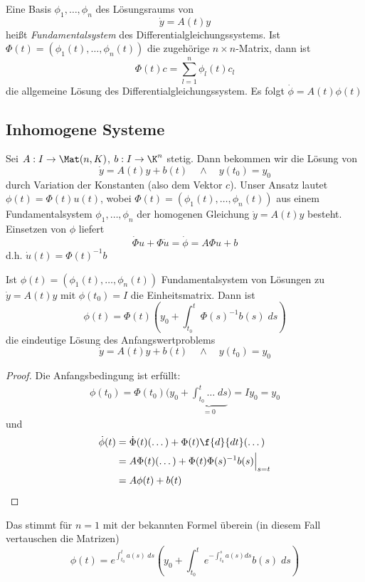 \documentclass{mycourse}
\begin{document}
Eine Basis $\phi_1,\dotsc, \phi_n$ des Lösungsraums von
\[
	\dot y = A(t) y
\]
heißt \emph{Fundamentalsystem} des Differentialgleichungssystems.
Ist $\Phi(t) = (\phi_1(t), \dotsc, \phi_n(t))$ die zugehörige $n\times n$-Matrix, dann ist
\[
	\Phi(t) c = \sum_{l=1}^n \phi_l(t) c_l
\]
die allgemeine Lösung des Differentialgleichungssystem.
Es folgt $\dot \phi = A(t) \phi(t)$


\subsection{Inhomogene Systeme}

Sei $A : I \to \Mat(n,K)$, $b:I\to \K^n$ stetig.
Dann bekommen wir die Lösung von
\[
	\dot y = A(t)y + b(t) \quad \land \quad y(t_0) = y_0
\]
durch Variation der Konstanten (also dem Vektor $c$).
Unser Ansatz lautet	$\phi(t) = \Phi(t) u(t)$, wobei
$\Phi(t) = (\phi_1(t),\dotsc, \phi_n(t))$ aus einem Fundamentalsystem $\phi_1,\dotsc, \phi_n$ der homogenen Gleichung $\dot y = A(t)y$ besteht.
Einsetzen von $\phi$ liefert
\[
	\dot \Phi u + \Phi \dot u = \dot \phi = A\Phi u + b
\]
d.h. $\dot u(t) = \Phi(t)^{-1}b$

\begin{st}
	Ist $\phi(t) = (\phi_1(t),\dotsc, \phi_n(t))$ Fundamentalsystem von Lösungen zu $\dot y = A(t)y$ mit $\phi(t_0) = I$ die Einheitsmatrix.
	Dann ist
	\[
		\phi(t) = \Phi(t)\left(y_0 + \int_{t_0}^t\Phi(s)^{-1}b(s) \; ds\right)
	\]
	die eindeutige Lösung des Anfangswertproblems
	\[
		\dot y = A(t)y + b(t) \quad \land \quad y(t_0) = y_0
	\]
	\begin{proof}
		\fixme[Ergänzen]
		Die Anfangsbedingung ist erfüllt:
		\begin{align*}
			\phi(t_0) = \Phi(t_0) \Big(y_0+\underbrace{\int_{t_0}^t \dotso \;ds}_{=0} \Big) = I y_0 = y_0
		\end{align*}
		und
		\begin{align*}
			\dot \phi(t) &= \dot \Phi(t) (\dotso) + \Phi(t) \f {d}{dt}(\dotso)\\
			&= A\Phi(t)(\dotso) + \Phi(t)\Phi(s)^{-1}b(s)\Big|_{s=t}\\
			&= A\phi(t) + b(t)
		\end{align*}
	\end{proof}
	\begin{note}
		Das stimmt für $n=1$ mit der bekannten Formel überein (in diesem Fall vertauschen die Matrizen)
		\[
			\phi(t) = e^{\int_{t_0}^t a(s) \;ds} \left(y_0 + \int_{t_0}^t e^{-\int_{t_0}^s a(s) ds} b(s) \;ds\right)
		\]
	\end{note}
\end{st}
\end{document}
